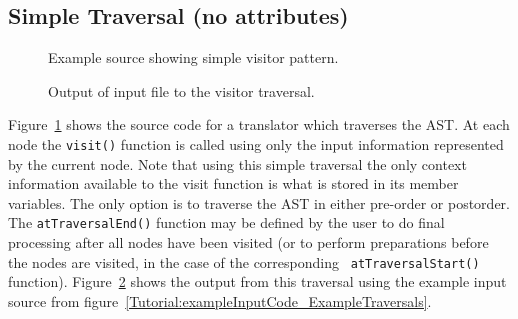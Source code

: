 \subsection{Simple Traversal (no attributes)}

\begin{figure}[!h]
{\indent
{\mySmallFontSize

\begin{latexonly}
   
\end{latexonly}

\begin{htmlonly}
   
\end{htmlonly}

}
}
\caption{Example source showing simple visitor pattern.}
\label{Tutorial:exampleVisitorTraversal}
\end{figure}


\begin{figure}[!h]
{\indent
{\mySmallFontSize


\begin{latexonly}
   
\end{latexonly}

\begin{htmlonly}
   
\end{htmlonly}

}
}
\caption{Output of input file to the visitor traversal.}
\label{Tutorial:exampleOutput_VisitorTraversal}
\end{figure}

Figure~\ref{Tutorial:exampleVisitorTraversal} shows the source code 
for a translator which traverses the AST.  At each node the 
{\tt visit()} function is called using only the input information
represented by the current node.  Note that using this simple traversal
the only context information available to the visit function is what is stored
in its member variables.
The only option is to traverse the AST in either pre-order or postorder.
The {\tt atTraversalEnd()} function may be defined by the user to do final
processing after all nodes have been visited (or to perform preparations
before the nodes are visited, in the case of the corresponding {\tt
atTraversalStart()} function).
Figure~\ref{Tutorial:exampleOutput_VisitorTraversal} shows the 
output from this traversal using the example input source from 
figure~\ref{Tutorial:exampleInputCode_ExampleTraversals}.

